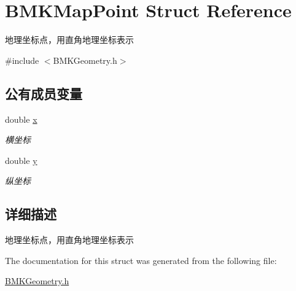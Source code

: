 \hypertarget{struct_b_m_k_map_point}{\section{B\-M\-K\-Map\-Point Struct Reference}
\label{struct_b_m_k_map_point}
}


地理坐标点，用直角地理坐标表示  




{\ttfamily \#include $<$B\-M\-K\-Geometry.\-h$>$}

\subsection*{公有成员变量}
\begin{DoxyCompactItemize}
\item 
\hypertarget{struct_b_m_k_map_point_a8c0ca1c3f0cbb5fe183ae7745781d8fb}{double \hyperlink{struct_b_m_k_map_point_a8c0ca1c3f0cbb5fe183ae7745781d8fb}{x}}\label{struct_b_m_k_map_point_a8c0ca1c3f0cbb5fe183ae7745781d8fb}

\begin{DoxyCompactList}\small\item\em 横坐标 \end{DoxyCompactList}\item 
\hypertarget{struct_b_m_k_map_point_a9d0aff0bad009459af85d1e51a194341}{double \hyperlink{struct_b_m_k_map_point_a9d0aff0bad009459af85d1e51a194341}{y}}\label{struct_b_m_k_map_point_a9d0aff0bad009459af85d1e51a194341}

\begin{DoxyCompactList}\small\item\em 纵坐标 \end{DoxyCompactList}\end{DoxyCompactItemize}


\subsection{详细描述}
地理坐标点，用直角地理坐标表示 

The documentation for this struct was generated from the following file\-:\begin{DoxyCompactItemize}
\item 
\hyperlink{_b_m_k_geometry_8h}{B\-M\-K\-Geometry.\-h}\end{DoxyCompactItemize}
